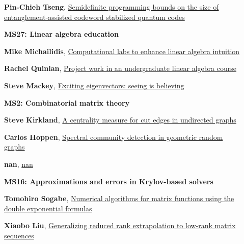 \documentclass[ILAS2025-program.tex]{subfiles}
\begin{document}
\begin{description}
\begin{description}
        \item[] \hypertarget{up0288}{}\textbf{Pin-Chieh Tseng}, \hyperlink{down0288}{Semidefinite programming bounds on the size of entanglement-assisted codeword stabilized quantum codes
}
        \end{description}
    \begin{description}
    \item[] {\color{mstitle}\textbf{MS27: Linear algebra education}} 
    \item[] \hypertarget{up0292}{}\textbf{Mike Michailidis}, \hyperlink{down0292}{Computational labs to enhance linear algebra intuition}
        \item[] \hypertarget{up0293}{}\textbf{Rachel Quinlan}, \hyperlink{down0293}{Project work in an undergraduate linear algebra course}
        \item[] \hypertarget{up0294}{}\textbf{Steve Mackey}, \hyperlink{down0294}{Exciting eigenvectors: seeing is believing}
        \end{description}
    \begin{description}
    \item[] {\color{mstitle}\textbf{MS2: Combinatorial matrix theory}} 
    \item[] \hypertarget{up0295}{}\textbf{Steve Kirkland}, \hyperlink{down0295}{A centrality measure for cut edges in undirected graphs
}
        \item[] \hypertarget{up0296}{}\textbf{Carlos Hoppen}, \hyperlink{down0296}{Spectral community detection in geometric random graphs}
        \item[] \hypertarget{up0297}{}\textbf{nan}, \hyperlink{down0297}{nan}
        \end{description}
    \begin{description}
    \item[] {\color{mstitle}\textbf{MS16: Approximations and errors in Krylov-based solvers}} 
    \item[] \hypertarget{up0301}{}\textbf{Tomohiro Sogabe}, \hyperlink{down0301}{Numerical algorithms for matrix functions using the double exponential formulas
}
        \item[] \hypertarget{up0302}{}\textbf{Xiaobo Liu}, \hyperlink{down0302}{Generalizing reduced rank extrapolation to low-rank matrix sequences
}
\end{description}
\end{description}
\end{document}
